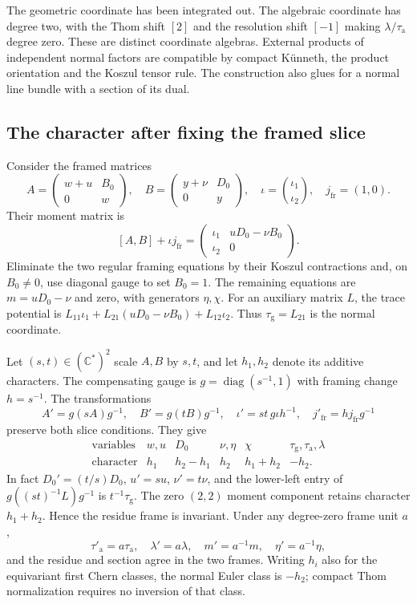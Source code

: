 The geometric coordinate has been integrated out.
The algebraic coordinate has degree two, with the
Thom shift $[2]$ and the resolution shift $[-1]$
making $\lambda/\tau_{\mathrm a}$ degree zero.
These are distinct coordinate algebras. External
products of independent normal factors are compatible
by compact K\"unneth, the product orientation and
the Koszul tensor rule. The construction also glues
for a normal line bundle with a section of its dual.

\subsection{The character after fixing the framed slice}

Consider the framed matrices
\[
 A=\begin{pmatrix}w+u&B_0\\0&w\end{pmatrix},\quad
 B=\begin{pmatrix}y+\nu&D_0\\0&y\end{pmatrix},\quad
 \iota=\binom{\iota_1}{\iota_2},\quad j_{\mathrm{fr}}=(1,0).
\]
Their moment matrix is
\[
 [A,B]+\iota j_{\mathrm{fr}}
 =\begin{pmatrix}\iota_1&uD_0-\nu B_0\\\iota_2&0\end{pmatrix}.
\]
Eliminate the two regular framing equations by their
Koszul contractions and, on $B_0\ne0$, use diagonal gauge to set
$B_0=1$. The remaining equations are
$m=uD_0-\nu$ and zero, with generators $\eta,\chi$.
For an auxiliary matrix $L$, the trace potential is
$L_{11}\iota_1+L_{21}(uD_0-\nu B_0)+L_{12}\iota_2$.
Thus $\tau_{\mathrm g}=L_{21}$ is the normal coordinate.

Let $(s,t)\in(\mathbb C^*)^2$ scale $A,B$ by $s,t$,
and let $h_1,h_2$ denote its additive characters.
The compensating gauge is
$g=\operatorname{diag}(s^{-1},1)$ with framing change
$h=s^{-1}$. The transformations
\[
 A'=g(sA)g^{-1},\quad B'=g(tB)g^{-1},\quad
 \iota'=st\,g\iota h^{-1},\quad
 j'_{\mathrm{fr}}=h j_{\mathrm{fr}}g^{-1}
\]
preserve both slice conditions. They give
\begin{equation}\label{cycompact:eq:normal-weights}
\begin{array}{c|ccccc}
 \text{variables}&w,u&D_0&\nu,\eta&\chi&
       \tau_{\mathrm g},\tau_{\mathrm a},\lambda\\\hline
 \text{character}&h_1&h_2-h_1&h_2&h_1+h_2&-h_2.
\end{array}
\end{equation}
In fact $D_0'=(t/s)D_0$, $u'=su$, $\nu'=t\nu$,
and the lower-left entry of
$g((st)^{-1}L)g^{-1}$ is $t^{-1}\tau_{\mathrm g}$.
The zero $(2,2)$ moment component retains character
$h_1+h_2$. Hence the residue frame is invariant.
Under any degree-zero frame unit $a$,
\[
 \tau'_{\mathrm a}=a\tau_{\mathrm a},\quad
 \lambda'=a\lambda,\quad m'=a^{-1}m,\quad
 \eta'=a^{-1}\eta,
\]
and the residue and section agree in the two frames.
Writing $h_i$ also for the equivariant first Chern classes,
the normal Euler class is $-h_2$; compact Thom
normalization requires no inversion of that class.

